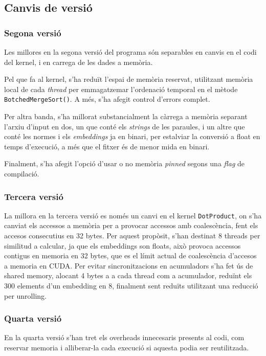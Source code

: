 \documentclass[catalan,10pt,a4paper]{article}
\begin{document}
\subsection*{Canvis de versió}
\subsubsection*{Segona versió}

Les millores en la segona versió del programa són separables en canvis en el codi del kernel, i en carrega de les dades a memòria.

Pel que fa al kernel, s'ha reduït l'espai de memòria reservat, utilitzant memòria local de cada \textit{thread} per emmagatzemar l'ordenació temporal en el mètode \verb|BotchedMergeSort()|. A més, s'ha afegit control d'errors complet.

Per altra banda, s'ha millorat substancialment la càrrega a memòria separant l'arxiu d'input en dos, un que conté els \textit{strings} de les paraules, i un altre que conté les normes i els \textit{embeddings} ja en binari, per estalviar la conversió a float en temps d'execució, a més que el fitxer és de menor mida en binari.

Finalment, s'ha afegit l'opció d'usar o no memòria \textit{pinned} segons una \textit{flag} de compilació.


\subsubsection*{Tercera versió}

La millora en la tercera versió es només un canvi en el kernel \verb|DotProduct|, on s'ha canviat els accessos a memòria per a provocar accessos amb coalescència, fent els accesos consecutius en 32 bytes. Per aquest propòsit, s'han destinat 8 threads per similitud a calcular, ja que els embeddings son floats, això provoca accessos contigus en memoria en 32 bytes, que es el límit actual de coalescència d'accesos a memoria en CUDA. Per evitar sincronitzacions en acumuladors s'ha fet ús de shared memory, alocant 4 bytes a a cada thread com a acumulador, reduïnt els 300 elements d'un embedding en 8, finalment sent reduïts utilitzant una reducció per unrolling.

\subsubsection*{Quarta versió}

En la quarta versió s'han tret els overheads innecesaris presents al codi, com reservar memoria i alliberar-la cada execució si aquesta podia ser reutilitzada.
\end{document}
